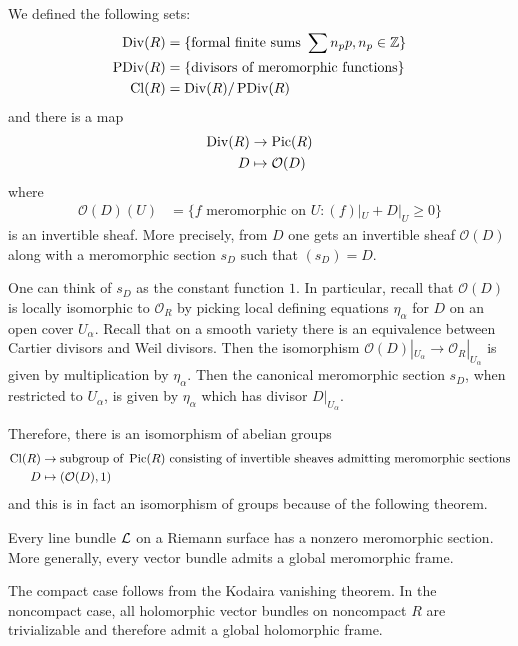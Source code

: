 \documentclass[12pt]{article}
\begin{document}
We defined the following sets:
\begin{align*}
    \operatorname{Div}(R) & = \{\text{formal finite sums } \sum n_p p, n_p \in \mathbb{Z}\} \\
    \operatorname{PDiv}(R) & = \{\text{divisors of meromorphic functions}\} \\
    \operatorname{Cl}(R) & = \operatorname{Div}(R)/\operatorname{PDiv}(R)
\end{align*} and there is a map \begin{align*}
    \operatorname{Div}(R) & \to \operatorname{Pic}(R) \\
    D & \mapsto \mathcal{O}(D)
\end{align*} where \begin{align*}
    \mathcal{O}(D)(U) & = \{f \text{ meromorphic on } U : (f)|_U + D|_U \geq 0\}
\end{align*} is an invertible sheaf. More precisely, from $D$ one gets an invertible sheaf $\mathcal{O}(D)$ along with a meromorphic section $s_D$ such that $(s_D)=D$. 

One can think of $s_D$ as the constant function $1$. In particular, recall that $\mathcal{O}(D)$ is locally isomorphic to $\mathcal{O}_R$ by picking local defining equations $\eta_\alpha$ for $D$ on an open cover $U_\alpha$. Recall that on a smooth variety there is an equivalence between Cartier divisors and Weil divisors.
Then the isomorphism $\mathcal{O}(D)|_{U_\alpha} \to \mathcal{O}_R|_{U_\alpha}$ is given by multiplication by $\eta_\alpha$. Then the canonical meromorphic section $s_D$, when restricted to $U_\alpha$, is given by $\eta_\alpha$ which has divisor $D|_{U_\alpha}$.

Therefore, there is an isomorphism of abelian groups \begin{align*}
    \operatorname{Cl}(R) & \to \text{subgroup of } \operatorname{Pic}(R) \text{ consisting of invertible sheaves admitting meromorphic sections} \\
    D & \mapsto (\mathcal{O}(D), 1)
\end{align*} and this is in fact an isomorphism of groups because of the following theorem.

\begin{theorem}
    Every line bundle ${\mathcal{L}}$ on a Riemann surface has a nonzero meromorphic section. More generally, every vector bundle admits a global meromorphic frame.
\end{theorem}

\begin{remark}
    The compact case follows from the Kodaira vanishing theorem. In the noncompact case, all holomorphic vector bundles on noncompact $R$ are trivializable and therefore admit a global holomorphic frame.
\end{remark}
\end{document}
